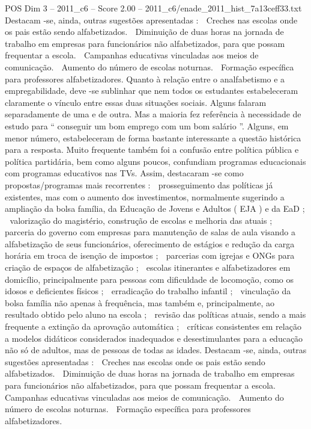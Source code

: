 \begin{textsample}{POS Dim 3 – 2011\_c6 – Score 2.00 – 2011\_c6/enade\_2011\_hist\_7a13ceff33.txt}
Destacam -se, ainda, outras sugestões apresentadas :  Creches nas escolas onde os pais estão sendo alfabetizados.  Diminuição de duas horas na jornada de trabalho em empresas para funcionários não alfabetizados, para que possam frequentar a escola.  Campanhas educativas vinculadas aos meios de comunicação.  Aumento do número de escolas noturnas.  Formação específica para professores alfabetizadores.
Quanto à relação entre o analfabetismo e a empregabilidade, deve -se sublinhar que nem todos os estudantes estabeleceram claramente o vínculo entre essas duas situações sociais.
Alguns falaram separadamente de uma e de outra.
Mas a maioria fez referência à necessidade de estudo para “ conseguir um bom emprego com um bom salário ”.
Alguns, em menor número, estabeleceram de forma bastante interessante a questão histórica para a resposta.
Muito frequente também foi a confusão entre política pública e política partidária, bem como alguns poucos, confundiam programas educacionais com programas educativos nas TVs.
Assim, destacaram -se como propostas/programas mais recorrentes :  prosseguimento das políticas já existentes, mas com o aumento dos investimentos, normalmente sugerindo a ampliação da bolsa família, da Educação de Jovens e Adultos ( EJA ) e da EaD ;  valorização do magistério, construção de escolas e melhoria das atuais ;  parceria do governo com empresas para manutenção de salas de aula visando a alfabetização de seus funcionários, oferecimento de estágios e redução da carga horária em troca de isenção de impostos ;  parcerias com igrejas e ONGs para criação de espaços de alfabetização ;  escolas itinerantes e alfabetizadores em domicílio, principalmente para pessoas com dificuldade de locomoção, como os idosos e deficientes físicos ;  erradicação do trabalho infantil ;  vinculação da bolsa família não apenas à frequência, mas também e, principalmente, ao resultado obtido pelo aluno na escola ;  revisão das políticas atuais, sendo a mais frequente a extinção da aprovação automática ;  críticas consistentes em relação a modelos didáticos considerados inadequados e desestimulantes para a educação não só de adultos, mas de pessoas de todas as idades.
Destacam -se, ainda, outras sugestões apresentadas :  Creches nas escolas onde os pais estão sendo alfabetizados.  Diminuição de duas horas na jornada de trabalho em empresas para funcionários não alfabetizados, para que possam frequentar a escola.  Campanhas educativas vinculadas aos meios de comunicação.  Aumento do número de escolas noturnas.  Formação específica para professores alfabetizadores.

\end{textsample}
